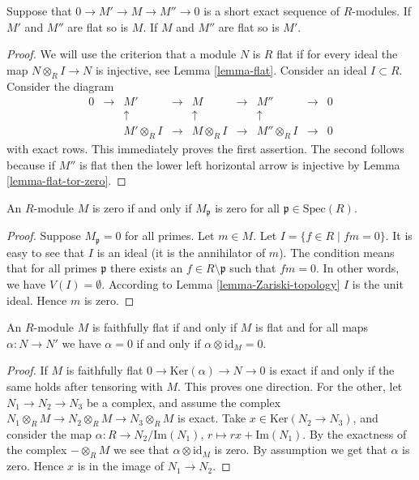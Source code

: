 \begin{lemma}
\label{lemma-flat-ses}
Suppose that $0 \to M' \to M \to M''\to 0$ is
a short exact sequence of $R$-modules.
If $M'$ and $M''$ are flat so is $M$.
If $M$ and $M''$ are flat so is $M'$.
\end{lemma}

\begin{proof}
We will use the criterion that a module $N$ is $R$ flat if for
every ideal the map $N\otimes_RI \to N$ is injective,
see Lemma \ref{lemma-flat}.
Consider an ideal $I \subset R$.
Consider the diagram
$$
\begin{matrix}
0
&
\to 
&
M'
&
\to
&
M
&
\to
&
M''
&
\to
&
0
\\
&
&
\uparrow
&
&
\uparrow
&
&
\uparrow
&
&
\\
& 
&
M'\otimes_R I
&
\to
&
M\otimes_R I
&
\to
&
M''\otimes_R I
&
\to
&
0
\end{matrix}
$$
with exact rows. This immediately proves the first assertion.
The second follows because if $M''$ is flat then the lower left 
horizontal arrow is injective by Lemma \ref{lemma-flat-tor-zero}.
\end{proof}

\begin{lemma}
\label{lemma-characterize-zero-local}
An $R$-module $M$ is zero if and only if $M_{\mathfrak p}$ is
zero for all $\mathfrak p \in \text{Spec}(R)$.
\end{lemma}

\begin{proof}
Suppose $M_{\mathfrak p} = 0$ for all primes. 
Let $m \in M$. Let $I = \{f \in R \mid fm = 0\}$.
It is easy to see that $I$ is an ideal (it is the
annihilator of $m$). The condition means that for
all primes $\mathfrak p$ there exists an $f \in R \setminus
\mathfrak p$ such that $fm =0$. In other words,
we have $V(I) = \emptyset$. According to Lemma 
\ref{lemma-Zariski-topology} $I$ is the unit ideal.
Hence $m$ is zero.
\end{proof}

\begin{lemma}
\label{lemma-easy-ff}
An $R$-module $M$ is faithfully flat if and only if $M$ is flat
and for all maps $\alpha : N \to N'$ we have 
$\alpha = 0$ if and only if $\alpha \otimes \text{id}_M = 0$.
\end{lemma}

\begin{proof}
If $M$ is faithfully flat $0 \to \text{Ker}(\alpha)
\to N \to 0$ is exact if and only if the same holds
after tensoring with $M$. This proves one direction.
For the other, let $N_1 \to N_2 \to N_3$
be a complex, and assume the complex
$N_1 \otimes_R M \to N_2 \otimes_R M \to N_3\otimes_R M$
is exact. Take $x \in \text{Ker}(N_2 \to N_3)$,
and consider the map $\alpha : R\to N_2/\text{Im}(N_1)$,
$r \mapsto rx + \text{Im}(N_1)$. By the exactness
of the complex $-\otimes_R M$ we see that $\alpha \otimes 
\text{id}_M$ is zero. By assumption we get that $\alpha$ is
zero. Hence $x $ is in the image of $N_1 \to N_2$.
\end{proof}

